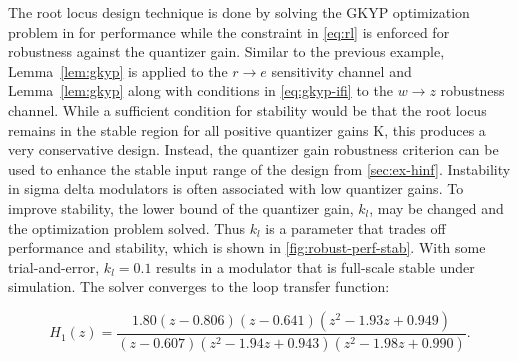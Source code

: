 The root locus design technique is done by solving the \gls{GKYP} optimization problem in for performance while the constraint in \autoref{eq:rl} is enforced for robustness against the quantizer gain. Similar to the previous example, Lemma~\ref{lem:gkyp} is applied to the $r \rightarrow e$ sensitivity channel and Lemma~\ref{lem:gkyp} along with conditions in \autoref{eq:gkyp-ifi} to the $w \rightarrow z$ robustness channel. While a sufficient condition for stability would be that the root locus remains in the stable region for all positive quantizer gains \gls{K}, this produces a very conservative design. Instead, the quantizer gain robustness criterion can be used to enhance the stable input range of the design from \autoref{sec:ex-hinf}. Instability in sigma delta modulators is often associated with low quantizer gains. To improve stability, the lower bound of the quantizer gain, $k_l$, may be changed and the optimization problem solved. Thus $k_l$ is a parameter that trades off performance and stability, which is shown in \autoref{fig:robust-perf-stab}. With some trial-and-error, $k_l=0.1$ results in a modulator that is full-scale stable under simulation. The solver converges to the loop transfer function:

\begin{equation*}
	H_1(z) = \frac{1.80\left(z - 0.806\right)\left(z - 0.641\right)\left(z^2 - 1.93z + 0.949\right)}{\left(z - 0.607\right)\left(z^2 - 1.94z + 0.943\right)\left(z^2 - 1.98z + 0.990\right)}.
\end{equation*}

